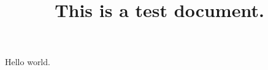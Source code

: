 \documentclass[12pt]{article}
\begin{document}
\title{This is a test document.}
\maketitle
Hello world.
\end{document}
